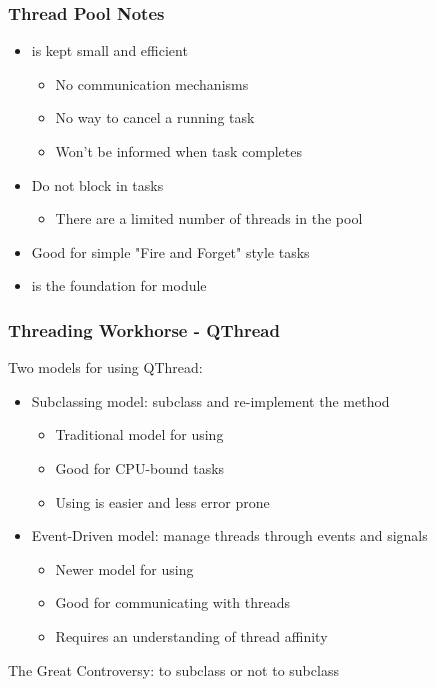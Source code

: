 \begin{slide}
\frametitle{Thread Pool Notes}

\begin{itemize}
\item {} is kept small and efficient
  \begin{itemize}
  \item No communication mechanisms
  \item No way to cancel a running task
  \item Won't be informed when task completes
  \end{itemize}
\item Do not block in tasks
  \begin{itemize}
  \item There are a limited number of threads in the pool
  \end{itemize}
\item Good for simple "Fire and Forget" style tasks
\vspace{1em}
\item {} is the foundation for  module
\end{itemize}

\end{slide}


\begin{slide}
\frametitle{Threading Workhorse - QThread}

Two models for using QThread:
\begin{itemize}
\item Subclassing model: subclass and re-implement the  method
  \begin{itemize}
  \item Traditional model for using 
  \item Good for CPU-bound tasks
  \item Using  is easier and less error prone
  \end{itemize}
\item Event-Driven model: manage threads through events and signals
  \begin{itemize}
  \item Newer model for using 
  \item Good for communicating with threads
  \item Requires an understanding of thread affinity
  \end{itemize}
\end{itemize}

\vspace{1em}
The Great  Controversy: to subclass or not to subclass \\

\end{slide}

